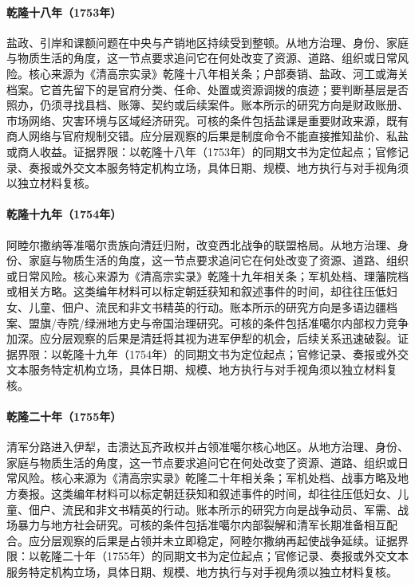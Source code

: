 \hypertarget{social:EQ-1753-SALT-ADMINISTRATION}{}\paragraph{乾隆十八年（1753年）}盐政、引岸和课额问题在中央与产销地区持续受到整顿。从地方治理、身份、家庭与物质生活的角度，这一节点要求追问它在何处改变了资源、道路、组织或日常风险。核心来源为《清高宗实录》乾隆十八年相关条；户部奏销、盐政、河工或海关档案。它首先留下的是官府分类、任命、处置或资源调拨的痕迹；要判断基层是否照办，仍须寻找县档、账簿、契约或后续案件。账本所示的研究方向是财政账册、市场网络、灾害环境与区域经济研究。可核的条件包括盐课是重要财政来源，既有商人网络与官府规制交错。应分层观察的后果是制度命令不能直接推知盐价、私盐或商人收益。证据界限：以乾隆十八年（1753年）的同期文书为定位起点；官修记录、奏报或外交文本服务特定机构立场，具体日期、规模、地方执行与对手视角须以独立材料复核。
\hypertarget{social:EQ-1754-AMURSANA-DEFECTION}{}\paragraph{乾隆十九年（1754年）}阿睦尔撒纳等准噶尔贵族向清廷归附，改变西北战争的联盟格局。从地方治理、身份、家庭与物质生活的角度，这一节点要求追问它在何处改变了资源、道路、组织或日常风险。核心来源为《清高宗实录》乾隆十九年相关条；军机处档、理藩院档或相关方略。这类编年材料可以标定朝廷获知和叙述事件的时间，却往往压低妇女、儿童、佃户、流民和非文书精英的行动。账本所示的研究方向是多语边疆档案、盟旗/寺院/绿洲地方史与帝国治理研究。可核的条件包括准噶尔内部权力竞争加深。应分层观察的后果是清廷将其视为进军伊犁的机会，后续关系迅速破裂。证据界限：以乾隆十九年（1754年）的同期文书为定位起点；官修记录、奏报或外交文本服务特定机构立场，具体日期、规模、地方执行与对手视角须以独立材料复核。
\hypertarget{social:EQ-1755-ILI-EXPEDITION}{}\paragraph{乾隆二十年（1755年）}清军分路进入伊犁，击溃达瓦齐政权并占领准噶尔核心地区。从地方治理、身份、家庭与物质生活的角度，这一节点要求追问它在何处改变了资源、道路、组织或日常风险。核心来源为《清高宗实录》乾隆二十年相关条；军机处档、战事方略及地方奏报。这类编年材料可以标定朝廷获知和叙述事件的时间，却往往压低妇女、儿童、佃户、流民和非文书精英的行动。账本所示的研究方向是战争动员、军需、战场暴力与地方社会研究。可核的条件包括准噶尔内部裂解和清军长期准备相互配合。应分层观察的后果是占领并未立即稳定，阿睦尔撒纳再起使战争延续。证据界限：以乾隆二十年（1755年）的同期文书为定位起点；官修记录、奏报或外交文本服务特定机构立场，具体日期、规模、地方执行与对手视角须以独立材料复核。
